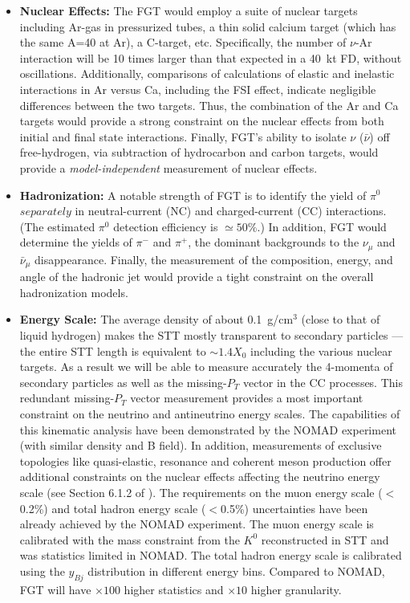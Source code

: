 \begin{itemize}
    \item {\bf Nuclear Effects:} The FGT would employ a suite of
      nuclear targets including Ar-gas in pressurized tubes, a thin
      solid calcium target (which has the same A=40 at Ar), a
      C-target, etc.  Specifically, the number of $\nu$-Ar interaction
      will be 10 times larger than that expected in a 40~kt FD,
      without oscillations. Additionally, comparisons of calculations
      of elastic and inelastic interactions in Ar versus Ca, including
      the FSI effect, indicate negligible differences between the two
      targets. Thus, the combination of the Ar and Ca targets would
      provide a strong constraint on the nuclear effects from both
      initial and final state interactions.  Finally, FGT's ability to
      isolate $\nu$ ($\bar\nu$) off free-hydrogen, via subtraction of
      hydrocarbon and carbon targets, would provide a 
      {\em model-independent} measurement of nuclear effects.

    \item {\bf Hadronization:} A notable strength of FGT is to
      identify the yield of $\pi^0$ $separately$ in neutral-current
      (NC) and charged-current (CC) interactions. (The estimated
      $\pi^0$ detection efficiency is $\simeq 50\%$.) In addition, FGT
      would determine the yields of $\pi^-$ and $\pi^+$, the dominant
      backgrounds to the $\nu_\mu$ and $\bar\nu_\mu$
      disappearance. Finally, the measurement of the composition,
      energy, and angle of the hadronic jet would provide a tight
      constraint on the overall hadronization models.

    \item {\bf Energy Scale:} The average density of about
      0.1~g/cm$^3$ (close to that of liquid hydrogen) makes the STT
      mostly transparent to secondary particles --- the entire STT
      length is equivalent to $\sim 1.4 X_0$ including the various
      nuclear targets. As a result we will be able to measure
      accurately the 4-momenta of secondary particles as well as the
      missing-$P_T$ vector in the CC processes.  This redundant
      missing-$P_T$ vector measurement provides a most important
      constraint on the neutrino and antineutrino energy scales. The
      capabilities of this kinematic analysis have been demonstrated
      by the NOMAD experiment (with similar density and B field).  In
      addition, measurements of exclusive topologies like
      quasi-elastic, resonance and coherent meson production offer
      additional constraints on the nuclear effects affecting the
      neutrino energy scale (see Section 6.1.2 of \volphys).  %
The requirements on the muon energy scale
      ($<$0.2\%) and total hadron energy scale ($<$0.5\%)
      uncertainties have been already achieved by the NOMAD
      experiment. The muon energy scale is calibrated with the mass
      constraint from the $K^0$ reconstructed in STT and was
      statistics limited in NOMAD. The total hadron energy scale is
      calibrated using the $y_{Bj}$ distribution in different energy
      bins. Compared to NOMAD, FGT will have $\times 100$ higher
      statistics and $\times 10$ higher granularity.
\end{itemize}


